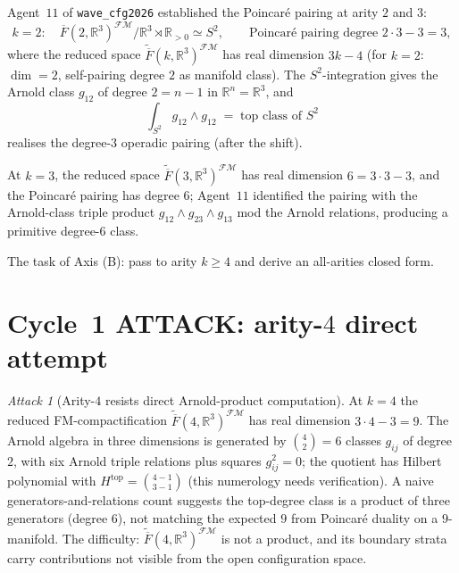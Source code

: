 \documentclass[11pt]{article}
\theoremstyle{definition}
\theoremstyle{remark}
\newtheorem{attack}[theorem]{Attack}
\providecommand{\FMbar}{\overline{F}}
\providecommand{\FM}{\mathcal{FM}}
\providecommand{\FM}{\mathrm{FM}}
\providecommand{\RR}{\mathbb{R}}
\begin{document}
Agent~$11$ of \texttt{wave\_cfg2026} established the Poincar\'e pairing
at arity $2$ and $3$:
\[
 k = 2: \quad \FMbar(2,\RR^3)^{\FM}/\RR^3 \rtimes \RR_{>0} \simeq S^2,
 \qquad \text{Poincar\'e pairing degree } 2 \cdot 3 - 3 = 3,
\]
where the reduced space $\widetilde{\FMbar}(k,\RR^3)^{\FM}$ has real
dimension $3k - 4$ (for $k = 2$: $\dim = 2$, self-pairing degree $2$
as manifold class). The $S^2$-integration gives the
Arnold class $g_{12}$ of degree $2 = n - 1$ in $\RR^n = \RR^3$, and
\[
 \int_{S^2} g_{12} \wedge g_{12} \;=\; \text{top class of } S^2
\]
realises the degree-$3$ operadic pairing (after the shift).

At $k = 3$, the reduced space $\widetilde{\FMbar}(3,\RR^3)^{\FM}$ has
real dimension $6 = 3 \cdot 3 - 3$, and the Poincar\'e pairing has
degree $6$; Agent~$11$ identified the pairing with the Arnold-class
triple product $g_{12} \wedge g_{23} \wedge g_{13}$ mod the Arnold
relations, producing a primitive degree-$6$ class.

The task of Axis (B): pass to arity $k \geq 4$ and derive an all-arities
closed form.

\section{Cycle~1 ATTACK: arity-$4$ direct attempt}

\begin{attack}[Arity-$4$ resists direct Arnold-product computation]
\label{att:b-cycle-1}
At $k = 4$ the reduced FM-compactification
$\widetilde{\FMbar}(4,\RR^3)^{\FM}$ has real dimension
$3 \cdot 4 - 3 = 9$. The Arnold algebra in three dimensions is
generated by $\binom{4}{2} = 6$ classes $g_{ij}$ of degree $2$, with
six Arnold triple relations plus squares $g_{ij}^2 = 0$; the quotient
has Hilbert polynomial with $H^{\mathrm{top}} = \binom{4-1}{3-1}$
(this numerology needs verification). A naive generators-and-relations
count suggests the top-degree class is a product of three generators
(degree $6$), not matching the expected $9$ from Poincar\'e duality
on a $9$-manifold. The difficulty: $\widetilde{\FMbar}(4,\RR^3)^{\FM}$
is not a product, and its boundary strata carry contributions not
visible from the open configuration space.
\end{attack}
\end{document}
